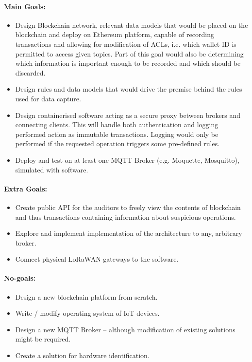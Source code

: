 \documentclass[a4paper,12pt]{article}
\begin{document}
\paragraph{Main Goals:}
\begin{itemize}
  \item Design Blockchain network, relevant data models that would be placed on the blockchain and deploy on Ethereum platform, capable of recording transactions and allowing for modification of ACLs, i.e. which wallet ID is permitted to access given topics. Part of this goal would also be determining which information is important enough to be recorded and which should be discarded.
  \item Design rules and data models that would drive the premise behind the rules used for data capture. 
  \item Design containerised software acting as a secure proxy between brokers and connecting clients. This will handle both authentication and logging performed action as immutable transactions. Logging would only be performed if the requested operation triggers some pre-defined rules.
  \item Deploy and test on at least one MQTT Broker (e.g. Moquette, Mosquitto), simulated with software.
\end{itemize}

\paragraph{Extra Goals:}
\begin{itemize}
  \item Create public API for the auditors to freely view the contents of blockchain and thus transactions containing information about suspicious operations.
  \item Explore and implement implementation of the architecture to any, arbitrary broker.
  \item Connect physical LoRaWAN gateways to the software.
\end{itemize}

\paragraph{No-goals:}
\begin{itemize}
  \item Design a new blockchain platform from scratch.
  \item Write / modify operating system of IoT devices.
  \item Design a new MQTT Broker -- although modification of existing solutions might be required.
  \item Create a solution for hardware identification.
\end{itemize}
\end{document}
